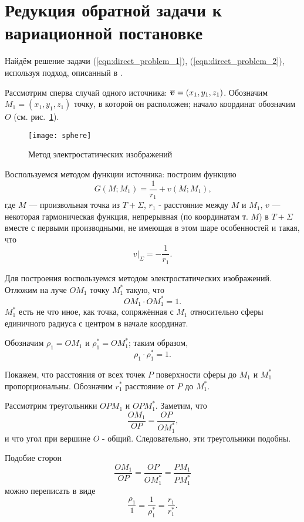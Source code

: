 \section{Редукция обратной задачи к вариационной постановке}

Найдём решение задачи (\ref{eqn:direct_problem_1}), (\ref{eqn:direct_problem_2}), используя подход, описанный в \cite[Гл.~4,~\S~4]{tikh}.

Рассмотрим сперва случай одного источника: $\boldsymbol{\overline{v}} = (x_1,y_1,z_1)$. Обозначим $M_1= (x_1,y_1,z_1)$ точку, в которой он расположен; начало координат обозначим $O$ (см. рис.~\ref{fig:source_func}).

\begin{figure}[h]
	\centering
	\texttt{[image: sphere]}
	\caption{Метод электростатических изображений}
	\label{fig:source_func}
\end{figure}

Воспользуемся методом функции источника: построим функцию
\begin{equation}
	G(M; M_1) = \frac{1}{ r_1} + v(M; M_1)\text{,}
\end{equation}
где $M$ --- произвольная точка из $T + \Sigma$, $r_1$ - расстояние между $M$ и $M_1$, $v$ --- некоторая гармоническая функция, непрерывная (по координатам т. $M$) в $T + \Sigma$ вместе с первыми производными, не имеющая в этом шаре особенностей и такая, что
\begin{equation}
	v\big|_\Sigma=-\frac{1}{ r_1}\text{.}
\end{equation}

Для построения воспользуемся методом электростатических изображений. Отложим на луче $OM_1$ точку $M_1^*$ такую, что
\[
OM_1 \cdot OM_1^* = 1\text{.}
\]
$M_1^*$ есть не что иное, как точка, сопряжённая с $M_1$ относительно сферы единичного радиуса с центром в начале координат.

Обозначим $\rho_1 = OM_1$ и $\rho_1^* = OM_1^*$; таким образом,
\[
\rho_1 \cdot \rho_1^* = 1\text{.}
\]

Покажем, что расстояния от всех точек $P$ поверхности сферы до $M_1$ и $M_1^*$ пропорциональны. Обозначим $r_1^*$ расстояние от $P$ до $M_1^*$.

Рассмотрим треугольники $OPM_1$ и $OPM_1^*$. Заметим, что
\[
\frac{OM_1}{OP} = \frac{OP}{OM_1^*}\text{,}
\]
и что угол при вершине $O$ - общий. Следовательно, эти треугольники подобны.

Подобие сторон
\[
\frac{OM_1}{OP} =
\frac{OP}{OM_1^*} =
\frac{PM_1}{PM_1^*}
\]
можно переписать в виде
\begin{equation}
	\frac{\rho_1}{1} =
	\frac{1}{\rho_1^*} =
	\frac{r_1}{r_1^*}\text{.}\label{proportion}
\end{equation}

